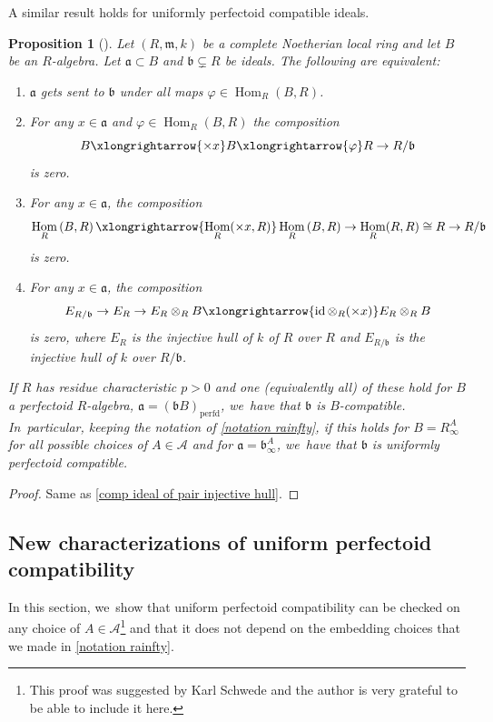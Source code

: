 \documentclass[JEP,XML,SOM,Unicode,published]{cedram}
\let\autoref\cref
\theoremstyle{plain}
\newtheorem{proposition}[theorem]{Proposition}
\theoremstyle{definition}
\numberwithin{equation}{theorem}
\let\tensor\otimes
\newcommand{\fra}{\mathfrak{a}}
\newcommand{\frab}{\mathfrak{b}}
\newcommand{\fram}{\mathfrak{m}}
\DeclareMathOperator{\Hom}{Hom}
\DeclareMathOperator{\id}{{id}}
\newcommand{\perfd}{_{\mathrm{perfd}}}
\newcommand{\sA}{\mathcal{A}}
\renewcommand{\phi}{\varphi}
\newcommand{\rafty}{R^A_\infty}
\begin{document}
A similar result holds for uniformly perfectoid compatible ideals.

\begin{proposition}[{\cf \cite[Lem.\,5.1]{SchwedeCentersOfFPurity}}]\label{uniformly compatible injective hull}
Let $(R,\fram,k)$ be a complete Noetherian local ring and let $B$ be an $R$\nobreakdash-algebra.
Let $\fra\subset B$ and $\frab \subsetneq R$ be ideals. The following are equivalent:
\begin{enumerate}
\item $\fra$ gets sent to $\frab$ under all maps $\phi\in \Hom_R(B,R)$.
\item For any $x\in \fra$ and $\phi \in \Hom_R(B,R)$ the composition
\[
B \xlongrightarrow{\times x} B \xlongrightarrow{\phi} R \to R/\frab
\]
is zero.
\item For any $x\in \fra$, the composition
\[
\Hom_R\left(B,R\right)\xlongrightarrow{\Hom_R(\times x, R)}\Hom_R\left(B,R\right) \to \Hom_R(R,R)\cong R \to R/\frab
\]
is zero.
\item
For any $x\in \fra$, the composition
\[
E_{R/\frab} \to E_R \to E_R\tensor_R B \xlongrightarrow{\id\tensor_R (\times x)} E_R\tensor_R B
\]
is zero, where $E_R$ is the injective hull of $k$ of $R$ over $R$ and $E_{R/\frab} $ is the injective hull of $k$ over $R/\frab$.
\end{enumerate}

If $R$ has residue characteristic $p>0$ and one (equivalently all) of these hold for $B$ a perfectoid $R$\nobreakdash-algebra, $\fra=(\frab B)\perfd$, we~have that $\frab$ is $B$-compatible. In~particular, keeping the notation of \autoref{notation rainfty},
if this holds for $B=\rafty$ for all possible
choices of $A\in \sA$ and for $\fra=\frab^A_\infty$, we~have that $\frab$ is uniformly perfectoid compatible.
\end{proposition}

\begin{proof}
Same as \autoref{comp ideal of pair injective hull}.
\end{proof}

\subsection{New characterizations of uniform perfectoid compatibility} In this section, we~show that uniform perfectoid compatibility can be checked on any choice of $A\in \sA$\footnote{
This proof was suggested by Karl Schwede and the author is very grateful to be able to include it here.} and that it does not depend on the embedding choices that we made in \autoref{notation rainfty}.
\smallskip
\end{document}
